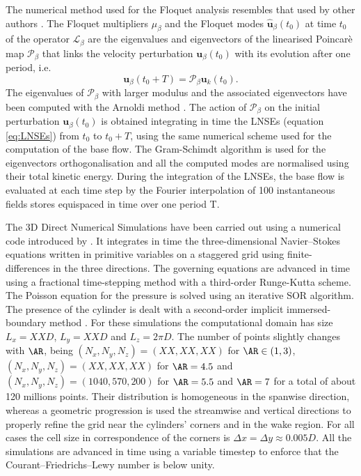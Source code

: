 \documentclass{jfm}
\begin{document}
The numerical method used for the Floquet analysis resembles that used by other authors \citep[see for example][]{barkley-henderson-1996}. The Floquet multipliers $\mu_\beta$ and the Floquet modes $\hat{\bm{u}}_\beta(t_0)$ at time $t_0$ of the operator $\mathcal{L}_\beta$ are the eigenvalues and eigenvectors of the linearised Poincarè map $\mathcal{P}_\beta$ that links the velocity perturbation $\bm{u}_\beta(t_0)$ with its evolution after one period, i.e.
%
\begin{equation}
\bm{u}_\beta(t_0+T) = \mathcal{P}_\beta \bm{u}_k(t_0).
\end{equation}
%
The eigenvalues of $\mathcal{P}_\beta$ with larger modulus and the associated eigenvectors have been computed with the Arnoldi method \citep{saad-2011}. The action of $\mathcal{P}_\beta$ on the initial perturbation $\bm{u}_\beta(t_0)$ is obtained integrating in time the LNSEs (equation \ref{eq:LNSEs}) from $t_0$ to $t_0+T$, using the same numerical scheme used for the computation of the base flow. The Gram-Schimdt algorithm is used for the eigenvectors orthogonalisation and all the computed modes are normalised using their total kinetic energy. During the integration of the LNSEs, the base flow is evaluated at each time step by the Fourier interpolation of 100 instantaneous fields stores equispaced in time over one period T.

The 3D Direct Numerical Simulations have been carried out using a numerical code introduced by \cite{luchini-2013}. It integrates in time the three-dimensional Navier--Stokes equations written in primitive variables on a staggered grid using finite-differences in the three directions. The governing equations are advanced in time using a fractional time-stepping method with a third-order Runge-Kutta scheme. The Poisson equation for the pressure is solved using an iterative SOR algorithm. The presence of the cylinder is dealt with a second-order implicit immersed-boundary method \citep{luchini-etal-2025}. For these simulations the computational domain has size $L_x=XXD$, $L_y=XXD$ and $L_z=2\pi D$. The number of points slightly changes with $\AR$, being $(N_x,N_y,N_z) = (XX,XX,XX)$ for $\AR \in (1,3)$, $(N_x,N_y,N_z)=(XX,XX,XX)$ for $\AR =4.5$ and$(N_x,N_y,N_z)=(1040,570,200)$ for $\AR=5.5 $ and $\AR=7$ for a total of about 120 millions points. Their distribution is homogeneous in the spanwise direction, whereas a geometric progression is used the streamwise and vertical directions to properly refine the grid near the cylinders' corners and in the wake region. For all cases the cell size in correspondence of the corners is $\Delta x = \Delta y \approx 0.005D$. All the simulations are advanced in time using a variable timestep to enforce that the Courant–Friedrichs–Lewy number is below unity. 
\end{document}
